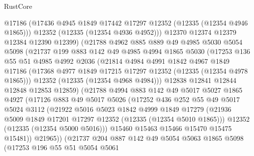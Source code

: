 \begin{lexlean}{RustCore}
\begin{coremodule}
              @17186
              (@17436 @4945 @1849 @17442 @17297 @12352 (@12335 (@12354 @4946 @1865)))
              @12352
              (@12335 (@12354 @4936 @4952)))
            @12370
            @12374
            @12379
            @12384
            @12390
            @12399)
          (@21788
            @4962
            @885
            @889
            @49
            @4985
            @5030
            @5054
            @5098
            (@21737
              @199
              @883
              @142
              @49
              @4985
              @4994
              @1865
              @5030
              (@17253
                @136
                @55
                @51
                @4985
                @4992
                @2036
                (@21814
                  @4984
                  @4991
                  @1842
                  @4967
                  @1849
                  @17186
                  (@17368 @4977 @1849 @17215 @17297 @12352 (@12335 (@12354 @4978 @1865)))
                  @12352
                  (@12335 (@12354 @4968 @4984)))
                @12838
                @12841
                @12844
                @12848
                @12853
                @12859)
              (@21788
                @4994
                @883
                @142
                @49
                @5017
                @5027
                @1865
                @4927
                (@17126
                  @883
                  @49
                  @5017
                  @5026
                  (@17252
                    @436
                    @252
                    @55
                    @49
                    @5017
                    @5024
                    @3112
                    (@21922
                      @5016
                      @5023
                      @1842
                      @4999
                      @1849
                      @17279
                      (@21936 @5009 @1849 @17201 @17297 @12352 (@12335 (@12354 @5010 @1865)))
                      @12352
                      (@12335 (@12354 @5000 @5016)))
                    @15460
                    @15463
                    @15466
                    @15470
                    @15475
                    @15481))
                @21965))
            (@21737
              @204
              @887
              @142
              @49
              @5054
              @5063
              @1865
              @5098
              (@17253
                @196
                @55
                @51
                @5054
                @5061

\end{coremodule}
\end{lexlean}
